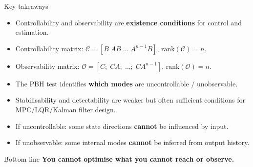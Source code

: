 \documentclass[aspectratio=169,10pt]{beamer}
\newcommand{\Ccal}{\mathcal{C}}
\newcommand{\Ocal}{\mathcal{O}}
\begin{document}
\begin{frame}{Key takeaways}
\begin{itemize}
  \item Controllability and observability are \textbf{existence conditions}
        for control and estimation.
  \item Controllability matrix:
  $\Ccal=[B\;AB\;\ldots\;A^{n-1}B]$, \quad
  $\mathrm{rank}(\Ccal)=n$.
  \item Observability matrix:
  $\Ocal=[C;\;CA;\;\ldots;\;CA^{n-1}]$, \quad
  $\mathrm{rank}(\Ocal)=n$.
  \item The PBH test identifies \textbf{which modes} are
        uncontrollable / unobservable.
  \item Stabilisability and detectability are weaker but often sufficient
        conditions for MPC/LQR/Kalman filter design.
  \item If uncontrollable: some state directions \textbf{cannot} be
        influenced by input.
  \item If unobservable: some internal modes \textbf{cannot} be inferred
        from output history.
\end{itemize}

\begin{summarybox}{Bottom line}
\textbf{You cannot optimise what you cannot reach or observe.}
\end{summarybox}
\end{frame}
\end{document}

